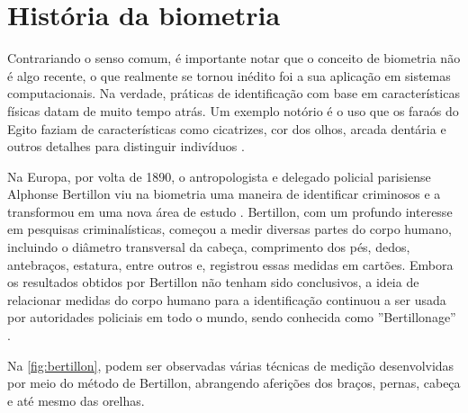 \section{História da biometria}\label{sec:histbiometria}

Contrariando o senso comum, é importante notar que o conceito de biometria 
não é algo recente, o que realmente se tornou inédito foi a sua aplicação 
em sistemas computacionais. Na verdade, práticas de identificação com base 
em características físicas datam de muito tempo atrás. Um exemplo notório 
é o uso que os faraós do Egito faziam de características como cicatrizes, 
cor dos olhos, arcada dentária e outros detalhes para distinguir 
indivíduos \cite{boechat2008}.

Na Europa, por volta de 1890, o antropologista e delegado policial 
parisiense Alphonse Bertillon viu na biometria uma maneira de identificar 
criminosos e a transformou em uma nova área de estudo \cite{moraes2006}. 
Bertillon, com um profundo interesse em pesquisas criminalísticas, 
começou a medir diversas partes do corpo humano, incluindo o diâmetro 
transversal da cabeça, comprimento dos pés, dedos, antebraços, estatura, 
entre outros e, registrou essas medidas em cartões. Embora os resultados 
obtidos por Bertillon não tenham sido conclusivos, a ideia de relacionar 
medidas do corpo humano para a identificação continuou a ser usada 
por autoridades policiais em todo o mundo, sendo conhecida como 
''Bertillonage'' \cite{boechat2008}.

Na \autoref{fig:bertillon}, podem ser observadas várias técnicas de medição 
desenvolvidas por meio do método de Bertillon, abrangendo aferições dos 
braços, pernas, cabeça e até mesmo das orelhas.

